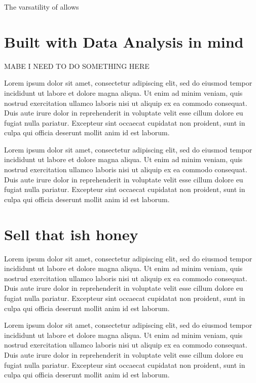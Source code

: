 \documentclass[letterpaper,10pt,english]{sphinxmanual}
\begin{document}
The varsatility of  allows 


\section{Built with Data Analysis in mind}
\label{\detokenize{intro:built-with-data-analysis-in-mind}}
MABE I NEED TO DO SOMETHING HERE

Lorem ipsum dolor sit amet, consectetur adipiscing elit, sed do eiusmod tempor incididunt ut labore et dolore magna aliqua. Ut enim ad minim veniam, quis nostrud exercitation ullamco laboris nisi ut aliquip ex ea commodo consequat. Duis aute irure dolor in reprehenderit in voluptate velit esse cillum dolore eu fugiat nulla pariatur. Excepteur sint occaecat cupidatat non proident, sunt in culpa qui officia deserunt mollit anim id est laborum.

Lorem ipsum dolor sit amet, consectetur adipiscing elit, sed do eiusmod tempor incididunt ut labore et dolore magna aliqua. Ut enim ad minim veniam, quis nostrud exercitation ullamco laboris nisi ut aliquip ex ea commodo consequat. Duis aute irure dolor in reprehenderit in voluptate velit esse cillum dolore eu fugiat nulla pariatur. Excepteur sint occaecat cupidatat non proident, sunt in culpa qui officia deserunt mollit anim id est laborum.


\section{Sell that ish honey}
\label{\detokenize{intro:sell-that-ish-honey}}
Lorem ipsum dolor sit amet, consectetur adipiscing elit, sed do eiusmod tempor incididunt ut labore et dolore magna aliqua. Ut enim ad minim veniam, quis nostrud exercitation ullamco laboris nisi ut aliquip ex ea commodo consequat. Duis aute irure dolor in reprehenderit in voluptate velit esse cillum dolore eu fugiat nulla pariatur. Excepteur sint occaecat cupidatat non proident, sunt in culpa qui officia deserunt mollit anim id est laborum.

Lorem ipsum dolor sit amet, consectetur adipiscing elit, sed do eiusmod tempor incididunt ut labore et dolore magna aliqua. Ut enim ad minim veniam, quis nostrud exercitation ullamco laboris nisi ut aliquip ex ea commodo consequat. Duis aute irure dolor in reprehenderit in voluptate velit esse cillum dolore eu fugiat nulla pariatur. Excepteur sint occaecat cupidatat non proident, sunt in culpa qui officia deserunt mollit anim id est laborum.
\end{document}
